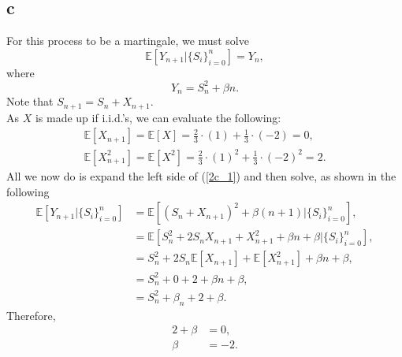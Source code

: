 \documentclass{article}
\begin{document}
\subsection{c}
For this process to be a martingale, we must solve
\begin{equation}
    \mathbb{E}[Y_{n+1}\vert\{S_i\}_{i=0}^n] = Y_n, \label{2c_1}
\end{equation}
where
\begin{equation}
    Y_n = S_n^2+\beta n.
\end{equation}
Note that $S_{n+1} = S_n + X_{n+1}$.\\
As $X$ is made up if i.i.d.'s, we can evaluate the following:
\begin{align}
    \mathbb{E}[X_{n+1}] = \mathbb{E}[X] = \frac{2}{3}\cdot (1) + \frac{1}{3}\cdot(-2) = 0, \\
    \mathbb{E}[X_{n+1}^2] = \mathbb{E}[X^2] = \frac{2}{3}\cdot (1)^2 + \frac{1}{3}\cdot(-2)^2 = 2.
\end{align}
All we now do is expand the left side of (\ref{2c_1}) and then solve, as shown in the following
\begin{align}
    \mathbb{E}[Y_{n+1}\vert\{S_i\}_{i=0}^n] &= \mathbb{E}[(S_n+X_{n+1})^2 + \beta(n+1)\vert\{S_i\}_{i=0}^n],\\
    &= \mathbb{E}[S_n^2 + 2S_nX_{n+1} + X_{n+1}^2 + \beta n + \beta \vert\{S_i\}_{i=0}^n],\\
    &= S_n^2 + 2S_n\mathbb{E}[X_{n+1}] + \mathbb{E}[X_{n+1}^2] + \beta n + \beta,\\
    &= S_n^2 + 0 + 2 + \beta n + \beta,\\
    &= S_n^2 + \beta_n + 2 + \beta.
\end{align}
Therefore,
\begin{align}
    2+\beta &=0,\\
    \beta &= -2.
\end{align}
\end{document}
